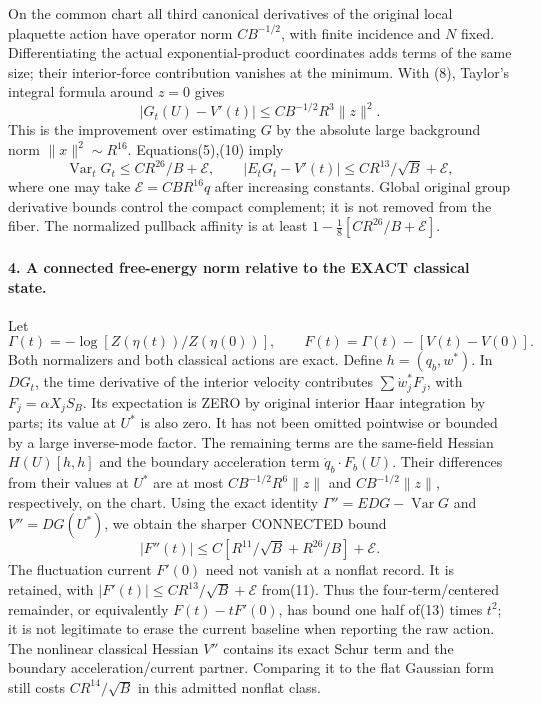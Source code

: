 \documentclass[11pt]{article}
\begin{document}
On the common chart all third canonical derivatives of the original local
plaquette action have operator norm $CB^{-1/2}$, with finite incidence and
$N$ fixed. Differentiating the actual exponential-product coordinates adds
terms of the same size; their interior-force contribution vanishes at the
minimum. With (8), Taylor's integral formula around $z=0$ gives
\[
 |G_t(U)-V'(t)|\le C B^{-1/2}R^3\|z\|^2.                              \tag{10}
\]
This is the improvement over estimating $G$ by the absolute large background
norm $\|x\|^2\sim R^{16}$. Equations(5),(10) imply
\[
 \operatorname{Var}_tG_t\le CR^{26}/B+\mathcal E,\qquad
 |E_tG_t-V'(t)|\le CR^{13}/\sqrt B+\mathcal E,                           \tag{11}
\]
where one may take $\mathcal E=CBR^{16}q$ after increasing constants.
Global original group derivative bounds control the compact complement;
it is not removed from the fiber. The normalized pullback affinity is at least
$1-\frac18[CR^{26}/B+\mathcal E]$.

\paragraph{4. A connected free-energy norm relative to the EXACT classical state.}
Let
\[
 \Gamma(t)=-\log[Z(\eta(t))/Z(\eta(0))],\qquad
 F(t)=\Gamma(t)-[V(t)-V(0)].                                            \tag{12}
\]
Both normalizers and both classical actions are exact. Define $h=(q_b,w^*)$.
In $DG_t$, the time derivative of the interior velocity contributes
$\sum\dot w_j^*F_j$, with $F_j=\alpha X_jS_B$. Its expectation is ZERO by
original interior Haar integration by parts; its value at $U^*$ is also zero.
It has not been omitted pointwise or bounded by a large inverse-mode factor.
The remaining terms are the same-field Hessian $H(U)[h,h]$ and the boundary
acceleration term $\dot q_b\cdot F_b(U)$. Their differences from their values
at $U^*$ are at most $CB^{-1/2}R^6\|z\|$ and
$CB^{-1/2}\|z\|$, respectively, on the chart.
Using the exact identity $\Gamma''=E DG-\operatorname{Var}G$ and
$V''=DG(U^*)$, we obtain the sharper CONNECTED bound
\[
 |F''(t)|\le C[R^{11}/\sqrt B+R^{26}/B]+\mathcal E.                     \tag{13}
\]
The fluctuation current $F'(0)$ need not vanish at a nonflat record. It is
retained, with $|F'(t)|\le CR^{13}/\sqrt B+\mathcal E$ from(11).
Thus the four-term/centered remainder, or equivalently
$F(t)-tF'(0)$, has bound one half of(13) times $t^2$; it is not legitimate to
erase the current baseline when reporting the raw action.
The nonlinear classical Hessian $V''$ contains its exact Schur term and the
boundary acceleration/current partner. Comparing it to the flat Gaussian
form still costs $CR^{14}/\sqrt B$ in this admitted nonflat class.
\end{document}
